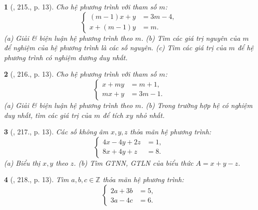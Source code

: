 \documentclass{article}
\newtheorem{baitoan}{}
\begin{document}
\begin{baitoan}[\cite{Binh_Toan_9_tap_2}, 215., p. 13]
	Cho hệ phương trình với tham số $m$:
	\begin{equation*}
		\left\{\begin{split}
			(m - 1)x + y &= 3m - 4,\\
			x + (m - 1)y &= m.
		\end{split}\right.
	\end{equation*}
	(a) Giải \& biện luận hệ phương trình theo $m$. (b) Tìm các giá trị nguyên của $m$ để nghiệm của hệ phương trình là các số nguyên. (c) Tìm các giá trị của $m$ để hệ phương trình có nghiệm dương duy nhất.
\end{baitoan}

\begin{baitoan}[\cite{Binh_Toan_9_tap_2}, 216., p. 13]
	Cho hệ phương trình với tham số $m$:
	\begin{equation*}
		\left\{\begin{split}
			x + my &= m + 1,\\
			mx + y &= 3m - 1.
		\end{split}\right.
	\end{equation*}
	(a) Giải \& biện luận hệ phương trình theo $m$. (b) Trong trường hợp hệ có nghiệm duy nhất, tìm các giá trị của $m$ để tích $xy$ nhỏ nhất.
\end{baitoan}

\begin{baitoan}[\cite{Binh_Toan_9_tap_2}, 217., p. 13]
	Các số không âm $x,y,z$ thỏa mãn hệ phương trình:
	\begin{equation*}
		\left\{\begin{split}
			4x - 4y + 2z &= 1,\\
			8x + 4y + z &= 8.
		\end{split}\right.
	\end{equation*}
	(a) Biểu thị $x,y$ theo $z$. (b) Tìm {\rm GTNN, GTLN} của biểu thức $A = x + y - z$.
\end{baitoan}

\begin{baitoan}[\cite{Binh_Toan_9_tap_2}, 218., p. 13]
	Tìm $a,b,c\in\mathbb{Z}$ thỏa mãn hệ phương trình:
	\begin{equation*}
		\left\{\begin{split}
			2a + 3b &= 5,\\
			3a - 4c &= 6.
		\end{split}\right.
	\end{equation*}
\end{baitoan}
\end{document}
